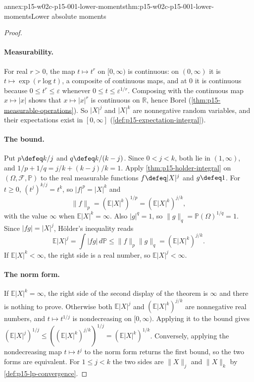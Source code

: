 \begin{annexitem}{annex:p15-w02c-p15-001-lower-moments}{thm:p15-w02c-p15-001-lower-moments}{Lower absolute moments}
\begin{proof}
\paragraph{Measurability.}
For real \(r>0\), the map \(t\mapsto t^r\) on \([0,\infty)\) is
continuous: on \((0,\infty)\) it is \(t\mapsto\exp(r\log t)\), a
composite of continuous maps, and at \(0\) it is continuous because
\(0\leq t^r\leq\varepsilon\) whenever \(0\leq t\leq\varepsilon^{1/r}\).
Composing with the continuous map \(x\mapsto|x|\) shows that
\(x\mapsto|x|^r\) is continuous on \(\mathbb R\), hence Borel
(\cref{thm:p15-measurable-operations}). So \(|X|^j\) and \(|X|^k\) are
nonnegative random variables, and their expectations exist in
\([0,\infty]\) (\cref{def:p15-expectation-integral}).

\paragraph{The bound.}
Put \(p\defeq k/j\) and \(q\defeq k/(k-j)\). Since \(0<j<k\), both lie
in \((1,\infty)\), and \(1/p+1/q=j/k+(k-j)/k=1\). Apply
\cref{thm:p15-holder-integral} on \((\Omega,\mathcal F,\mathbb P)\) to
the real measurable functions \(f\defeq|X|^j\) and \(g\defeq1\). For
\(t\geq0\), \((t^j)^{k/j}=t^k\), so \(|f|^p=|X|^k\) and
\[
 \|f\|_p=\left(\mathbb E|X|^k\right)^{1/p}
 =\left(\mathbb E|X|^k\right)^{j/k},
\]
with the value \(\infty\) when \(\mathbb E|X|^k=\infty\). Also
\(|g|^q=1\), so \(\|g\|_q=\mathbb P(\Omega)^{1/q}=1\). Since
\(|fg|=|X|^j\), H\"older's inequality reads
\[
 \mathbb E|X|^j=\int|fg|\,d\mathbb P\leq\|f\|_p\|g\|_q
 =\left(\mathbb E|X|^k\right)^{j/k}.
\]
If \(\mathbb E|X|^k<\infty\), the right side is a real number, so
\(\mathbb E|X|^j<\infty\).

\paragraph{The norm form.}
If \(\mathbb E|X|^k=\infty\), the right side of the second display of the
theorem is \(\infty\) and there is nothing to prove. Otherwise both
\(\mathbb E|X|^j\) and \((\mathbb E|X|^k)^{j/k}\) are nonnegative real
numbers, and \(t\mapsto t^{1/j}\) is nondecreasing on \([0,\infty)\).
Applying it to the bound gives
\((\mathbb E|X|^j)^{1/j}\leq((\mathbb E|X|^k)^{j/k})^{1/j}
=(\mathbb E|X|^k)^{1/k}\). Conversely, applying the nondecreasing map
\(t\mapsto t^j\) to the norm form returns the first bound, so the two forms
are equivalent. For \(1\leq j<k\) the two sides are \(\|X\|_j\) and
\(\|X\|_k\) by \cref{def:p15-lp-convergence}.
\end{proof}
\end{annexitem}

